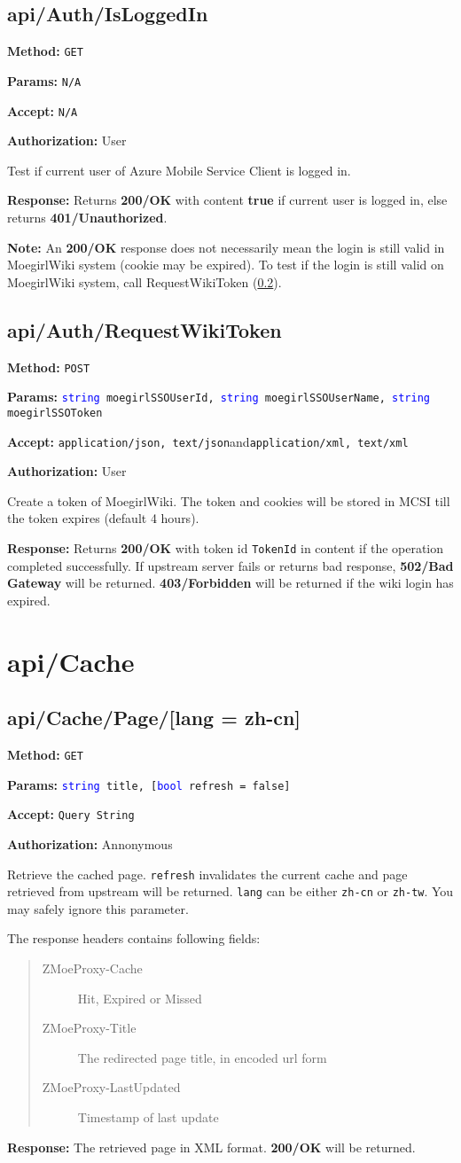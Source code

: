 \documentclass[a4paper,11pt]{report}
\newcommand{\method}[1]{\textsf{\textbf{Method:}} #1}
\newcommand{\params}[1]{\textsf{\textbf{Params:}} \texttt{#1}}
\newcommand{\accept}[1]{\textsf{\textbf{Accept:}} #1}
\newcommand{\response}[1]{\textsf{\textbf{Response:}} #1}
\newcommand{\auth}[1]{\textsf{\textbf{Authorization:}} #1}
\newcommand{\webapi}[6]{
    \method{#1}

    \params{#2}

    \accept{#3}

    \auth{#4}

    #5

    \response{#6}
    }
\newcommand{\sand}{\textsf{and}\xspace}
\newcommand{\httppost}{\texttt{POST}}
\newcommand{\httpget}{\texttt{GET}}
\newcommand{\json}{\texttt{application/json, text/json}\xspace}
\newcommand{\xml}{\texttt{application/xml, text/xml}\xspace}
\newcommand{\querystring}{\texttt{Query String}\xspace}
\newcommand{\na}{\texttt{N/A}\xspace}
\newcommand{\true}{\textbf{true}\xspace}
\newcommand{\ok}{\textbf{200/OK}\xspace}
\newcommand{\unauth}{\textbf{401/Unauthorized}\xspace}
\newcommand{\forbidden}{\textbf{403/Forbidden}\xspace}
\newcommand{\badgateway}{\textbf{502/Bad Gateway}\xspace}
\newcommand{\authanno}{Annonymous}
\newcommand{\authuser}{User}
\newcommand{\typestring}{\textcolor{blue}{string }}
\newcommand{\typebool}{\textcolor{blue}{bool }}
\begin{document}
\subsection{api/Auth/IsLoggedIn}
\webapi
{\httpget}
{N/A}
{\na}
{\authuser}
{Test if current user of Azure Mobile Service Client is logged in.}
{Returns \ok with content \true if current user is logged in, else returns \unauth.

\textbf{Note: } An \ok response does not necessarily mean the login is still valid in MoegirlWiki system (cookie may be expired).
To test if the login is still valid on MoegirlWiki system, call RequestWikiToken (\ref{sec:api:auth:requestwikitoken}).
}

\subsection{api/Auth/RequestWikiToken}
\label{sec:api:auth:requestwikitoken}
\webapi
{\httppost}
{\typestring moegirlSSOUserId, \typestring moegirlSSOUserName, \typestring moegirlSSOToken}
{\json \sand \xml}
{\authuser}
{Create a token of MoegirlWiki. The token and cookies will be stored in MCSI till the token expires (default 4 hours). }
{Returns \ok with token id \texttt{TokenId} in content if the operation completed successfully. If upstream server fails or returns bad response, \badgateway will be returned.
\forbidden will be returned if the wiki login has expired.}

\section{api/Cache}

\subsection{api/Cache/Page/[lang = zh-cn]}
\webapi
{\httpget}
{\typestring title, [\typebool refresh = false]}
{\querystring}
{\authanno}
{Retrieve the cached page. \texttt{refresh} invalidates the current cache and page retrieved from upstream will be returned. \texttt{lang} can be either \texttt{zh-cn} or \texttt{zh-tw}. You may safely ignore this parameter.

The response headers contains following fields:
\begin{quote}
    \begin{description}
        \item[\textsf{ZMoeProxy-Cache}] Hit, Expired or Missed
        \item[\textsf{ZMoeProxy-Title}] The redirected page title, in encoded url form
        \item[\textsf{ZMoeProxy-LastUpdated}] Timestamp of last update
    \end{description}
\end{quote}
}
{The retrieved page in XML format. \ok will be returned.}
\end{document}

